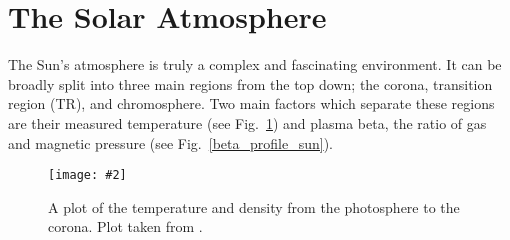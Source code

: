 \documentclass[12pt]{ociamthesis}
\newcommand{\mfig}[4]{
  \begin{figure}
  \begin{center}
  \texttt{[image: \#2]}
  \caption{#3}
  \label{#4}
  \end{center}
  \end{figure}}
\begin{document}
\section{The Solar Atmosphere}
\label{sec:sol_atmos}
The Sun's atmosphere is truly a complex and fascinating environment. It can be broadly  split into three main regions from the top down; the corona, transition region (TR), and chromosphere. Two main factors which separate these regions are their measured temperature (see Fig.~\ref{t_profile_sun}) and plasma beta, the ratio of gas and magnetic pressure (see Fig.~\ref{beta_profile_sun}).
\mfig{0.725}{figures/T_regoins}{A plot of the temperature and density from the photosphere to the corona. Plot taken from \cite{Lang_2006ses}.}{t_profile_sun}
\end{document}
